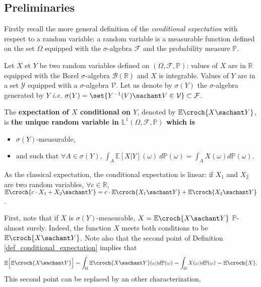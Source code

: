 \subsection{Preliminaries}
Firstly recall the more general definition of the \textit{conditional 
expectation} with respect to a random variable:
a random variable is a measurable function defined on the set $\Omega$
equipped with the $\sigma$-algebra $\mathcal{F}$ and the probability measure $\mathbb{P}$.
\begin{Def} \label{def_conditional_expectation}
Let $X$ et $Y$ be two random variables defined on $(\Omega,\mathcal{F},\mathbb{P})$:
values of $X$ are in $\mathbb{R}$ equipped with the Borel $\sigma$-algebra $\mathcal{B}(\mathbb{R})$ 
and $X$ is integrable. Values of $Y$ are in a set $\mathcal{Y}$ equipped with a $\sigma$-algebra $\mathcal{V}$.
Let us denote by $\sigma(Y)$ the $\sigma$-algebra generated 
by $Y$ \textit{i.e.} $\sigma(Y) = \set{ Y^{-1}(V) \sachant V \in \mathcal{V}} \subset \mathcal{F}$.

The \textbf{expectation of $X$ conditional on $Y$}, denoted by $\mathbb{E} \croch{ X \sachant Y }$, 
is \textbf{the unique random variable in $\mathbb{L}^1(\Omega,\mathcal{F},\mathbb{P})$ which is} 
\begin{itemize}
\item $\sigma(Y)$-measurable,
\item and such that $\forall A \in \sigma(Y)$, $\displaystyle \int_{A} \mathbb{E} [X \vert Y](\omega) \ d \mathbb{P}(\omega)
 = \int_{A} X(\omega) d \mathbb{P}(\omega)$.
\end{itemize}
As the classical expectation, the conditional expectation is linear: 
if $X_1$ and $X_2$ are two random variables, $\forall c \in \mathbb{R}$,
$\mathbb{E} \croch{ c\cdot X_1 + X_2 \sachant Y  } = c \cdot \mathbb{E} \croch{ X_1 \sachant Y  }  + \mathbb{E} \croch{ X_2 \sachant Y }$.
\end{Def}
First, note that if $X$ is $\sigma(Y)$-measurable, $X = \mathbb{E} \croch{ X \sachant Y }$ $\mathbb{P}$-almost surely.
Indeed, the function $X$ meets both conditions 
to be $ \mathbb{E} \croch{ X \sachant Y }$.
Note also that the second point of Definition \ref{def_conditional_expectation}
implies that \[ \mathbb{E} \Big[ \mathbb{E} \croch{ X \sachant Y } \Big] = \int_{\Omega} \mathbb{E} \croch{ X \sachant Y }(\omega) d \mathbb{P}(\omega) = \int_{\Omega} X(\omega) d \mathbb{P}(\omega) = \mathbb{E} \croch{X}. \] 
This second point 
can be replaced by an other characterization,
